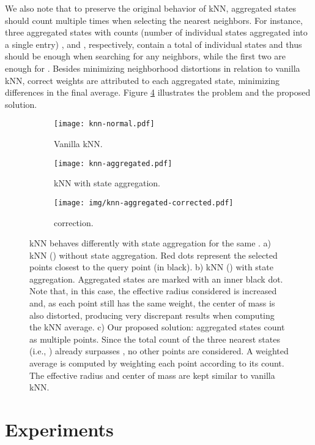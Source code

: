 \documentclass{article}
\begin{document}
We also note that to preserve the original behavior of kNN, aggregated states should count multiple times when selecting the nearest neighbors. For instance, three aggregated states with counts (number of individual states aggregated into a single entry) ,  and , respectively, contain a total of  individual states and thus should be enough when searching for any  neighbors, while the first two are enough for . Besides minimizing neighborhood distortions in relation to vanilla kNN, correct weights are attributed to each aggregated state, minimizing differences in the final average. Figure \ref{fig:knn} illustrates the problem and the proposed solution.

\begin{figure}[htb]
    \centering
    \begin{subfigure}{.3\textwidth}
        \centering
        \texttt{[image: knn-normal.pdf]}
        \caption{Vanilla kNN.}
        \label{fig:knn1}
    \end{subfigure}
    \begin{subfigure}{.3\textwidth}
        \centering
        \texttt{[image: knn-aggregated.pdf]}
        \caption{kNN with state aggregation.}
        \label{fig:knn2}
    \end{subfigure}
    \begin{subfigure}{.3\textwidth}
        \centering
        \texttt{[image: img/knn-aggregated-corrected.pdf]}
        \caption{ correction.}
        \label{fig:knn3}
    \end{subfigure}
    \caption{kNN behaves differently with state aggregation for the same . a) kNN () without state aggregation. Red dots represent the  selected points closest to the query point (in black). b) kNN () with state aggregation. Aggregated states are marked with an inner black dot. Note that, in this case, the effective radius considered is increased and, as each point still has the same weight, the center of mass is also distorted, producing very discrepant results when computing the kNN average. c) Our proposed solution: aggregated states count as multiple points. Since the total count of the three nearest states (i.e., ) already surpasses , no other points are considered. A weighted average is computed by weighting each point according to its count. The effective radius and center of mass are kept similar to vanilla kNN.}
    \label{fig:knn}
\end{figure}


\section{Experiments}
\label{sec:experiments}
\end{document}

